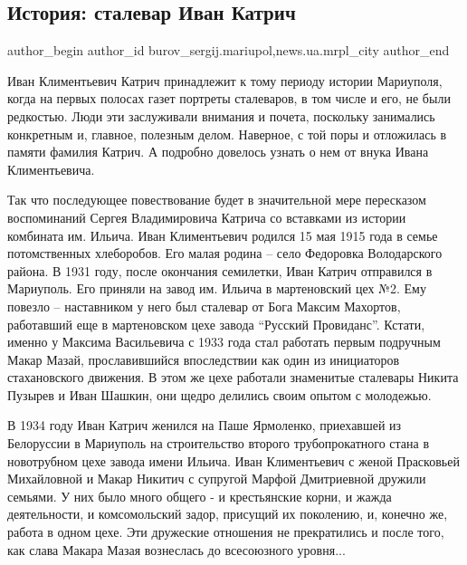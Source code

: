  
 
 
 
 
 
\subsection{История: сталевар Иван Катрич}
\label{sec:22_04_2017.stz.news.ua.mrpl_city.1.istoria_stalevar_ivan_katrich}
 
\ifcmt
 author_begin
   author_id burov_sergij.mariupol,news.ua.mrpl_city
 author_end
\fi


Иван Климентьевич Катрич принадлежит к тому периоду истории Мариуполя, когда на
первых полосах газет портреты сталеваров, в том числе и его, не были редкостью.
Люди эти заслуживали внимания и почета, поскольку занимались конкретным и,
главное, полезным делом. Наверное, с той поры и отложилась в памяти фамилия
Катрич. А подробно довелось узнать о нем от внука Ивана Климентьевича.

Так что последующее повествование будет в значительной мере пересказом
воспоминаний Сергея Владимировича Катрича со вставками из истории комбината им.
Ильича. Иван Климентьевич родился 15 мая 1915 года в семье потомственных
хлеборобов. Его малая родина – село Федоровка Володарского района. В 1931 году,
после окончания семилетки, Иван Катрич отправился в Мариуполь. Его приняли на
завод им. Ильича в мартеновский цех №2. Ему повезло – наставником у него был
сталевар от Бога Максим Махортов, работавший еще в мартеновском цехе завода
\enquote{Русский Провиданс}. Кстати, именно у Максима Васильевича с 1933 года стал
работать первым подручным Макар Мазай, прославившийся впоследствии как один из
инициаторов стахановского движения.  В этом же цехе работали знаменитые
сталевары Никита Пузырев и Иван Шашкин, они щедро делились своим опытом с
молодежью.

В 1934 году Иван Катрич женился на Паше Ярмоленко, приехавшей из Белоруссии в
Мариуполь на строительство второго трубопрокатного стана в новотрубном цехе
завода имени Ильича. Иван Климентьевич с женой Прасковьей Михайловной и Макар
Никитич с супругой Марфой Дмитриевной дружили семьями. У них было много общего
- и крестьянские корни, и жажда деятельности, и комсомольский задор, присущий
их поколению, и, конечно же, работа в одном цехе. Эти дружеские отношения не
прекратились и после того, как слава Макара Мазая вознеслась до всесоюзного
уровня...

